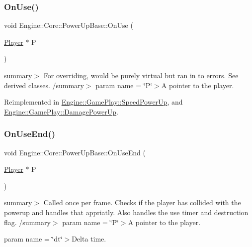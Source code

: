 \subsubsection{\texorpdfstring{On\+Use()}{OnUse()}}
{\footnotesize\ttfamily void Engine\+::\+Core\+::\+Power\+Up\+Base\+::\+On\+Use (\begin{DoxyParamCaption}\item[{\hyperlink{class_engine_1_1_game_play_1_1_player}{Player} $\ast$}]{P }\end{DoxyParamCaption})\hspace{0.3cm}{\ttfamily [virtual]}}

summary$>$ For overriding, would be purely virtual but ran in to errors. See derived classes. /summary$>$ param name = \char`\"{}\+P\char`\"{}$>$A pointer to the player.

Reimplemented in \hyperlink{class_engine_1_1_game_play_1_1_speed_power_up_a0901961fb01656a2b81ccf846e370e31}{Engine\+::\+Game\+Play\+::\+Speed\+Power\+Up}, and \hyperlink{class_engine_1_1_game_play_1_1_damage_power_up_abadfb61b67dd580bc98d7e120c2809cd}{Engine\+::\+Game\+Play\+::\+Damage\+Power\+Up}.

\mbox{\label{class_engine_1_1_core_1_1_power_up_base_a195aecea60afdb99add60661a1c95697}} 
\subsubsection{\texorpdfstring{On\+Use\+End()}{OnUseEnd()}}
{\footnotesize\ttfamily void Engine\+::\+Core\+::\+Power\+Up\+Base\+::\+On\+Use\+End (\begin{DoxyParamCaption}\item[{\hyperlink{class_engine_1_1_game_play_1_1_player}{Player} $\ast$}]{P }\end{DoxyParamCaption})\hspace{0.3cm}{\ttfamily [virtual]}}

summary$>$ Called once per frame. Checks if the player has collided with the powerup and handles that appriatly. Also handles the use timer and destruction flag. /summary$>$ param name = \char`\"{}\+P\char`\"{}$>$A pointer to the player.

param name = \char`\"{}dt\char`\"{}$>$Delta time.

